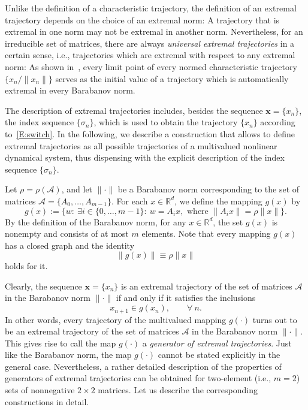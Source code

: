 \documentclass[a4paper,10pt,reqno]{amsart}
\let\cite\citep
\newcommand{\setA}{\mathscr{A}}
\begin{document}
Unlike the definition of a characteristic trajectory, the definition of an
extremal trajectory depends on the choice of an extremal norm: A trajectory
that is extremal in one norm may not be extremal in another norm.
Nevertheless, for an irreducible set of matrices, there are always
\emph{universal extremal trajectories} in a certain sense, i.e., trajectories
which are extremal with respect to any extremal norm: As shown
in~\cite[Th.~3]{Koz:INFOPROC06:e}, every limit point of every normed
characteristic trajectory $\{x_{n}/\|x_{n}\|\}$ serves as the initial value
of a trajectory which is automatically extremal in every Barabanov norm.

The description of extremal trajectories includes, besides the sequence
$\boldsymbol{x}=\{x_{n}\}$, the index sequence $\{\sigma_{n}\}$, which is
used to obtain the trajectory $\{x_{n}\}$ according to~\eqref{E:switch}. In
the following, we describe a construction that allows to define extremal
trajectories as all possible trajectories of a multivalued nonlinear
dynamical system, thus dispensing with the explicit description of the index
sequence $\{\sigma_{n}\}$.

Let $\rho=\rho(\setA)$, and let $\|\cdot\|$ be a Barabanov norm corresponding
to the set of matrices $\setA=\{A_{0},\ldots,A_{m-1}\}$. For each
$x\in\mathbb{R}^{d}$, we define the mapping $g(x)$ by
\begin{equation}\label{Eq-ExtTraject}
g(x):=\{w:~\exists i\in\{0,\ldots,m-1\}:~ w=A_{i}x,\textrm{~where~}
\|A_{i}x\|=\rho\|x\|\}.
\end{equation}
By the definition of the Barabanov norm, for any ${x\in\mathbb{R}^{d}}$, the
set $g(x)$ is nonempty and consists of at most $m$ elements. Note that every
mapping $g(x)$ has a closed graph and the identity
\begin{equation}\label{Eq-genextseq1}
\|g(x)\|\equiv \rho\|x\|
\end{equation} holds for it.

Clearly, the sequence $\boldsymbol{x}=\{x_{n}\}$ is an extremal trajectory of
the set of matrices $\setA$ in the Barabanov norm $\|\cdot\|$ if and only if
it satisfies the inclusions
\[
x_{n+1}\in g(x_{n}),\qquad \forall~n.
\]
In other words, every trajectory of the multivalued mapping $g(\cdot)$ turns
out to be an extremal trajectory of the set of matrices $\setA$ in the
Barabanov norm $\|\cdot\|$. This gives rise to call the map $g(\cdot)$ a
\emph{generator of extremal trajectories}. Just like the Barabanov norm, the
map $g(\cdot)$ cannot be stated explicitly in the general case. Nevertheless,
a rather detailed description of the properties of generators of extremal
trajectories can be obtained for two-element (i.e., $m=2$) sets of
nonnegative ${2\times2}$ matrices. Let us describe the corresponding
constructions in detail.
\end{document}
